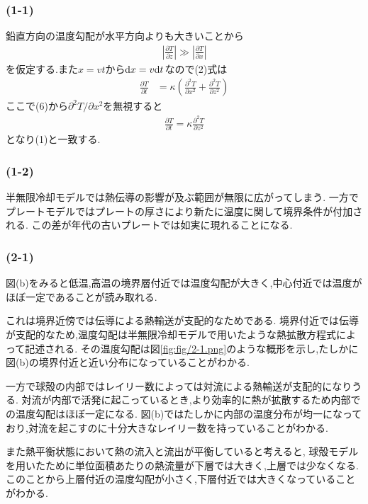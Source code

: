 \setcounter{equation}{5}
\subsubsection*{(1-1)}
鉛直方向の温度勾配が水平方向よりも大きいことから
\begin{align}
  \left|\frac{\partial T}{\partial z}\right|\gg\left|\frac{\partial T}{\partial x}\right|
\end{align}
を仮定する.また$x=vt$から${\rm d}x=v{\rm d}t$なので(2)式は
\begin{align}
  \frac{\partial T}{\partial t}&=\kappa\left(\frac{\partial^2T}{\partial x^2}+\frac{\partial^2 T}{\partial z^2}\right)
\end{align}
ここで(6)から$\partial^2 T/\partial x^2$を無視すると
\begin{align}
  \frac{\partial T}{\partial t}=\kappa\frac{\partial^2 T}{\partial z^2}
\end{align}
となり(1)と一致する.
\subsubsection*{(1-2)}
半無限冷却モデルでは熱伝導の影響が及ぶ範囲が無限に広がってしまう.
一方でプレートモデルではプレートの厚さにより新たに温度に関して境界条件が付加される.
この差が年代の古いプレートでは如実に現れることになる.
\subsubsection*{(2-1)}
図(b)をみると低温,高温の境界層付近では温度勾配が大きく,中心付近では温度がほぼ一定であることが読み取れる.

これは境界近傍では伝導による熱輸送が支配的なためである.
境界付近では伝導が支配的なため,温度勾配は半無限冷却モデルで用いたような熱拡散方程式によって記述される.
その温度勾配は図\ref{fig:fig/2-1.png}のような概形を示し,たしかに図(b)の境界付近と近い分布になっていることがわかる.

一方で球殻の内部ではレイリー数によっては対流による熱輸送が支配的になりうる.
対流が内部で活発に起こっているとき,より効率的に熱が拡散するため内部での温度勾配はほぼ一定になる.
図(b)ではたしかに内部の温度分布が均一になっており,対流を起こすのに十分大きなレイリー数を持っていることがわかる.

また熱平衡状態において熱の流入と流出が平衡していると考えると,
球殻モデルを用いたために単位面積あたりの熱流量が下層では大きく,上層では少なくなる.
このことから上層付近の温度勾配が小さく,下層付近では大きくなっていることがわかる.
